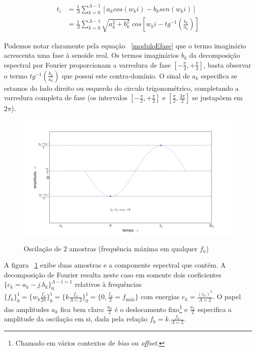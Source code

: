 \begin{equation}\label{moduloEfase}
\begin{split}
t_i& = \frac{1}{\Lambda}\sum_{k=0}^{\Lambda-1}\left[a_k cos(w_k i) -b_k sen(w_k i)\right] \\
   & = \frac{1}{\Lambda}\sum_{k=0}^{\Lambda-1}\sqrt{a_k^2 + b_k^2} \; cos\left[w_k i - tg^{-1}\left(\frac{b_k}{a_k}\right)\right]
\end{split}
\end{equation}

Podemos notar claramente pela equação ~\ref{moduloEfase} que o termo imaginário acrescenta uma fase à senoide real. Os termos imaginários $b_k$ da decomposição espectral por Fourier proporcionam a varredura de fase
 $[-\frac{\pi}{2},+\frac{\pi}{2}]$, basta observar o termo $tg^{-1}\left (\frac{b_k}{a_k}\right )$ que possui este contra-domínio. O sinal de $a_k$ especifica se estamos do lado direito ou esquerdo do circulo trigonométrico, completando a varredura completa de fase (os intervalos $[-\frac{\pi}{2},+\frac{\pi}{2}]$ e $[\frac{\pi}{2},\frac{3\pi}{2}]$ se justapõem em $2\pi$).


\begin{figure}[h!]
    \centering
    \caption{Oscilação de 2 amostras (frequência máxima em qualquer $f_a$)}
        \includegraphics[width=\textwidth]{figuras/amostras2c__}
        \label{fig:amostras2}
\end{figure}

A figura ~\ref{fig:amostras2} exibe duas amostras e a componente espectral que contém. A decomposição de Fourier resulta neste caso em somente dois coeficientes $\{c_k=a_k-j.b_k\}_0^{\Lambda-1=1}$ relativos à frequências $\{f_k\}_0^1=\{w_k\frac{f_a}{2\pi}\}_0^1=\{k\frac{f_a}{\Lambda=2}\}_0^1=\{0,\frac{f_a}{2}=f_{\text{máx}}\}$
com energias $e_k=\frac{(c_k)^2}{\Lambda=2}$. O papel das amplitudes $a_k$ fica bem claro:
 $\frac{a_0}{2}$ é o deslocamento fixo\footnote{Chamado em vários contextos de \emph{bias} ou \emph{offset}.} e $\frac{a_1}{2}$ especifica a amplitude da oscilação em si, dada pela relação $f_k=k . \frac{f_a}{\Lambda=2}$.

